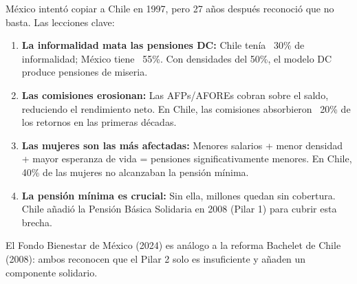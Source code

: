 \documentclass[11pt,a4paper]{report}
\begin{document}
\begin{tcolorbox}[colback=green!5!white, colframe=green!50!black, title=\textbf{Intuici\'on: Chile Ense\~n\'o que la Capitalizaci\'on Pura No Basta}]
M\'exico intent\'o copiar a Chile en 1997, pero 27 a\~nos despu\'es reconoci\'o que no basta. Las lecciones clave:

\begin{enumerate}
  \item \textbf{La informalidad mata las pensiones DC:} Chile ten\'ia ~30\% de informalidad; M\'exico tiene ~55\%. Con densidades del 50\%, el modelo DC produce pensiones de miseria.

  \item \textbf{Las comisiones erosionan:} Las AFPs/AFOREs cobran sobre el saldo, reduciendo el rendimiento neto. En Chile, las comisiones absorbieron ~20\% de los retornos en las primeras d\'ecadas.

  \item \textbf{Las mujeres son las m\'as afectadas:} Menores salarios + menor densidad + mayor esperanza de vida = pensiones significativamente menores. En Chile, 40\% de las mujeres no alcanzaban la pensi\'on m\'inima.

  \item \textbf{La pensi\'on m\'inima es crucial:} Sin ella, millones quedan sin cobertura. Chile a\~nadi\'o la Pensi\'on B\'asica Solidaria en 2008 (Pilar 1) para cubrir esta brecha.
\end{enumerate}

El Fondo Bienestar de M\'exico (2024) es an\'alogo a la reforma Bachelet de Chile (2008): ambos reconocen que el Pilar 2 solo es insuficiente y a\~naden un componente solidario.
\end{tcolorbox}
\end{document}
